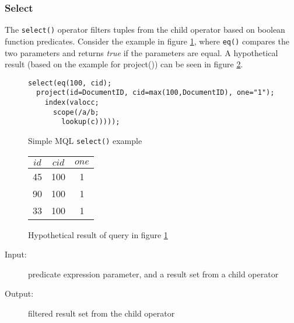 \subsubsection{Select}
The \texttt{select()} operator filters tuples from the child operator based on
boolean function predicates. Consider the example in figure
\ref{figure:mql:select_example}, where \texttt{eq()} compares the two parameters and
returns \textit{true} if the parameters are equal. A hypothetical result (based
on the example for \textsf{project()}) can be seen in figure
\ref{figure:mql:select_example_result}.

\begin{figure}[!h]
\centering
\begin{Verbatim}
select(eq(100, cid);
  project(id=DocumentID, cid=max(100,DocumentID), one="1");
    index(valocc;
      scope(/a/b;
        lookup(c)))));
\end{Verbatim}
\caption{Simple MQL \texttt{select()} example}
\label{figure:mql:select_example}
\end{figure}

\begin{figure}[!h]
\centering
\begin{tabular}{|c | c | c |}
\hline
$id$ & $cid$ & $one$ \\ \hline
45 & 100 & 1 \\ \hline
90 & 100 & 1 \\ \hline
33 & 100 & 1 \\ \hline
\end{tabular}
\caption{Hypothetical result of query in figure
\ref{figure:mql:select_example}}
\label{figure:mql:select_example_result}
\end{figure}

\begin{description}
  \item[Input:] predicate expression parameter, and a result set from a child
operator
  \item[Output:] filtered result set from the child operator 
\end{description}

